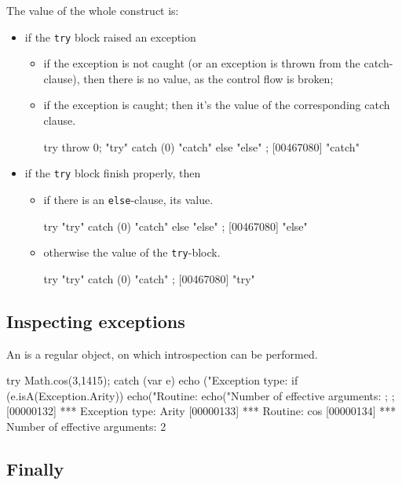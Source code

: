 The value of the whole construct is:
\begin{itemize}
\item if the \lstinline|try| block raised an exception
  \begin{itemize}
  \item if the exception is not caught (or an exception is thrown from the
    catch-clause), then there is no value, as the control flow is broken;
  \item if the exception is caught; then it's the value of the corresponding
    catch clause.
\begin{urbiscript}
try { throw 0; "try" } catch (0) { "catch" } else { "else" };
[00467080] "catch"
\end{urbiscript}
  \end{itemize}
\item if the \lstinline|try| block finish properly, then
  \begin{itemize}
  \item if there is an \lstinline|else|-clause, its value.
\begin{urbiscript}
try { "try" } catch (0) { "catch" } else { "else" };
[00467080] "else"
\end{urbiscript}
  \item otherwise the value of the \lstinline|try|-block.
\begin{urbiscript}
try { "try" } catch (0) { "catch" };
[00467080] "try"
\end{urbiscript}
  \end{itemize}
\end{itemize}


\subsection{Inspecting exceptions}

An  is a regular object, on which introspection
can be performed.

\begin{urbiscript}
try
{
  Math.cos(3,1415);
}
catch (var e)
{
  echo ("Exception type: %
  if (e.isA(Exception.Arity))
  {
    echo("Routine: %
    echo("Number of effective arguments: %
  };
};
[00000132] *** Exception type: Arity
[00000133] *** Routine: cos
[00000134] *** Number of effective arguments: 2
\end{urbiscript}

\subsection{Finally}
\label{sec:lang:except:finally}

